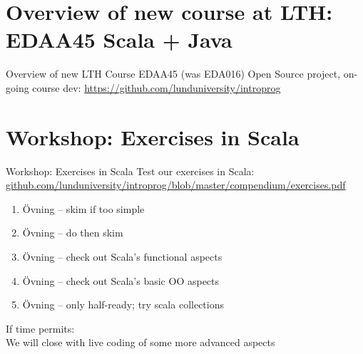 \documentclass{lecturenotes}
\begin{document}
\section[Overview of new course at LTH]{Overview of new course at LTH: EDAA45 Scala + Java}

\begin{Slide}{Overview of new LTH Course EDAA45 (was EDA016)}
Open Source project, on-going course dev: \url{https://github.com/lunduniversity/introprog} \\ \vspace{1em}

\noindent\resizebox{0.8\columnwidth}{!}{\fontsize{8}{10}\selectfont

}
\end{Slide}


\section[Workshop]{Workshop: Exercises in Scala}

\begin{Slide}{Workshop: Exercises in Scala}
Test our  exercises in Scala:  \\ 
\href{https://github.com/lunduniversity/introprog/blob/master/compendium/exercises.pdf}{\footnotesize github.com/lunduniversity/introprog/blob/master/compendium/exercises.pdf}
 \\ 

\begin{enumerate}
\item Övning   -- skim if too simple
\item Övning   -- do  then skim 
\item Övning  -- check out Scala's functional aspects
\item Övning  -- check out Scala's basic OO aspects
\item Övning  -- only half-ready; try scala collections 
\end{enumerate}

If time permits: \\ We will close with live coding of some more advanced aspects

\end{Slide}
\end{document}
